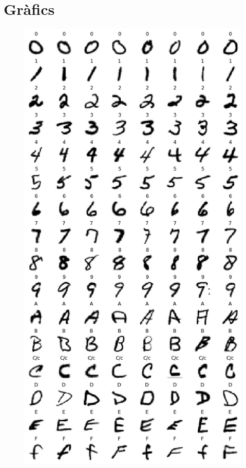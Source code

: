 \documentclass[12pt, spanish]{article}
\begin{document}
\clearpage
\appendix \label{sec:A}
\section{Gràfics}


\begin{figure}[hbt!]
\centering
\begin{minipage}{.33\textwidth}
  \centering
  \includegraphics[width=.95\linewidth]{images/samples_by_label1.png}

\end{minipage}
\end{figure}
\end{document}
